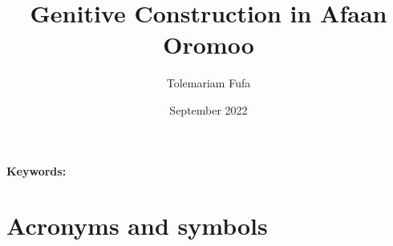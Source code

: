\documentclass[11pt,a4paper]{article}
\title {Genitive Construction in Afaan Oromoo}
\author {Tolemariam Fufa}
\date{September 2022}
\begin{document}
	\newcommand\keywords[1]{%
		\begingroup
		\let\and\\
		\par
		\noindent\textbf{Keywords:}\\#1\par
		\endgroup
	}
	\maketitle
	\begin{abstract}
		
	
		
		
	\end{abstract}
	\keywords{}
	\newpage
	\newpage
	
	
	
	\newpage
	\section*{Acronyms and symbols}
	
\end{document}
